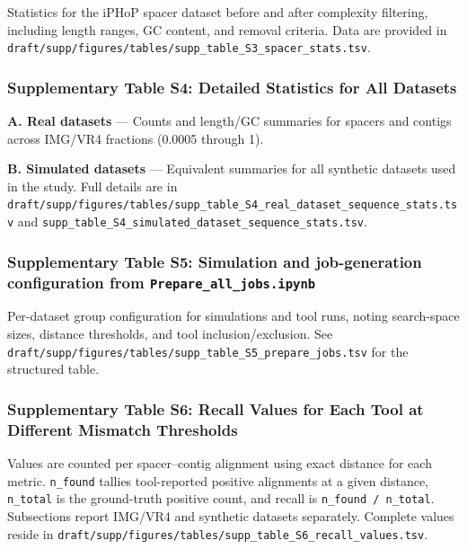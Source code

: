 \documentclass[
]{article}
\begin{document}
Statistics for the iPHoP spacer dataset before and after complexity
filtering, including length ranges, GC content, and removal criteria.
Data are provided in
\texttt{draft/supp/figures/tables/supp\_table\_S3\_spacer\_stats.tsv}.

\subsubsection{Supplementary Table S4: Detailed Statistics for All
Datasets}\label{tbl-supp-simulation-params}

\textbf{A. Real datasets} --- Counts and length/GC summaries for spacers
and contigs across IMG/VR4 fractions (0.0005 through 1).

\textbf{B. Simulated datasets} --- Equivalent summaries for all
synthetic datasets used in the study. Full details are in
\texttt{draft/supp/figures/tables/supp\_table\_S4\_real\_dataset\_sequence\_stats.tsv}
and \texttt{supp\_table\_S4\_simulated\_dataset\_sequence\_stats.tsv}.

\subsubsection{\texorpdfstring{Supplementary Table S5: Simulation and
job-generation configuration from
\texttt{Prepare\_all\_jobs.ipynb}}{Supplementary Table S5: Simulation and job-generation configuration from Prepare\_all\_jobs.ipynb}}\label{tbl-supp-prepare-jobs}

Per-dataset group configuration for simulations and tool runs, noting
search-space sizes, distance thresholds, and tool inclusion/exclusion.
See
\texttt{draft/supp/figures/tables/supp\_table\_S5\_prepare\_jobs.tsv}
for the structured table.

\subsubsection{Supplementary Table S6: Recall Values for Each Tool at
Different Mismatch Thresholds}\label{tbl-supp-recall}

Values are counted per spacer--contig alignment using exact distance for
each metric. \texttt{n\_found} tallies tool-reported positive alignments
at a given distance, \texttt{n\_total} is the ground-truth positive
count, and recall is \texttt{n\_found\ /\ n\_total}. Subsections report
IMG/VR4 and synthetic datasets separately. Complete values reside in
\texttt{draft/supp/figures/tables/supp\_table\_S6\_recall\_values.tsv}.
\end{document}
